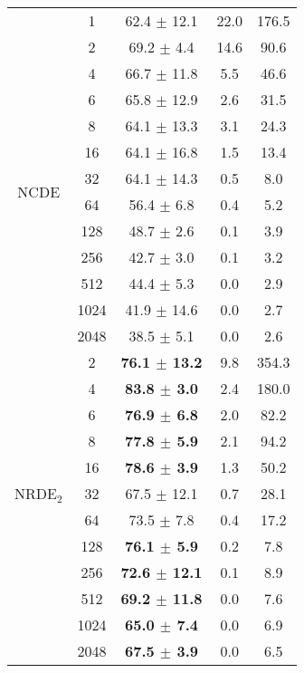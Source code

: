 \documentclass{article}
\begin{document}
\begin{table*}[t]
\begin{center}
\begin{tabular}{ccccc}
        \midrule
          & 1    &  62.4 $\pm$ 12.1 &          22.0 &         176.5 \\
          & 2    &   69.2 $\pm$ 4.4 &          14.6 &          90.6 \\
          & 4    &  66.7 $\pm$ 11.8 &           5.5 &          46.6 \\
          & 6    &  65.8 $\pm$ 12.9 &           2.6 &          31.5 \\
          & 8    &  64.1 $\pm$ 13.3 &           3.1 &          24.3 \\
          & 16   &  64.1 $\pm$ 16.8 &           1.5 &          13.4 \\
        \multirow{2}{*}{NCDE}  & 32   &  64.1 $\pm$ 14.3 &           0.5 &           8.0 \\
          & 64   &   56.4 $\pm$ 6.8 &           0.4 &           5.2 \\
          & 128  &   48.7 $\pm$ 2.6 &           0.1 &           3.9 \\
          & 256  &   42.7 $\pm$ 3.0 &           0.1 &           3.2 \\
          & 512  &   44.4 $\pm$ 5.3 &           0.0 &           2.9 \\
          & 1024 &  41.9 $\pm$ 14.6 &           0.0 &           2.7 \\
          & 2048 &   38.5 $\pm$ 5.1 &           0.0 &           2.6 \\
          
        \midrule
          & 2    &  \textbf{76.1 $\pm$ 13.2} &           9.8 &         354.3 \\
          & 4    &   \textbf{83.8 $\pm$ 3.0} &           2.4 &         180.0 \\
          & 6    &   \textbf{76.9 $\pm$ 6.8} &           2.0 &          82.2 \\
          & 8    &   \textbf{77.8 $\pm$ 5.9} &           2.1 &          94.2 \\
          & 16   &   \textbf{78.6 $\pm$ 3.9} &           1.3 &          50.2 \\
        NRDE$_2$ & 32   &  67.5 $\pm$ 12.1 &           0.7 &          28.1 \\
          & 64   &   73.5 $\pm$ 7.8 &           0.4 &          17.2 \\
          & 128  &   \textbf{76.1 $\pm$ 5.9} &           0.2 &           7.8 \\
          & 256  &  \textbf{72.6 $\pm$ 12.1} &           0.1 &           8.9 \\
          & 512  &  \textbf{69.2 $\pm$ 11.8} &           0.0 &           7.6 \\
          & 1024 &   \textbf{65.0 $\pm$ 7.4} &           0.0 &           6.9 \\
          & 2048 &   \textbf{67.5 $\pm$ 3.9} &           0.0 &           6.5 \\
          

\end{tabular}
\end{center}
\end{table*}
\end{document}
